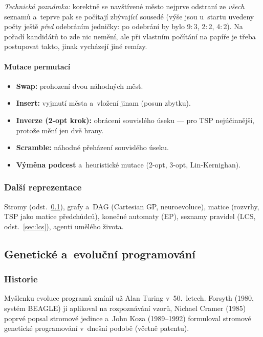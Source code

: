 \documentclass[11pt,a4paper]{article}
\theoremstyle{definition}
\begin{document}
\emph{Technická poznámka:} korektně se navštívené město nejprve odstraní ze
\emph{všech} seznamů a~teprve pak se počítají zbývající sousedé (výše jsou
u~startu uvedeny počty ještě \emph{před} odebráním jedničky: po odebrání by
bylo 9$:$3, 2$:$2, 4$:$2). Na pořadí kandidátů to zde nic nemění, ale při
vlastním počítání na papíře je třeba postupovat takto, jinak vycházejí
jiné remízy.

\paragraph{Mutace permutací}

\begin{itemize}
\item \textbf{Swap:} prohození dvou náhodných měst.
\item \textbf{Insert:} vyjmutí města a~vložení jinam (posun zbytku).
\item \textbf{Inverze (2-opt krok):} obrácení souvislého úseku --- pro TSP
  nejúčinnější, protože mění jen dvě hrany.
\item \textbf{Scramble:} náhodné přeházení souvislého úseku.
\item \textbf{Výměna podcest} a~heuristické mutace (2-opt, 3-opt, Lin-Kernighan).
\end{itemize}

\subsubsection{Další reprezentace}

Stromy (odst.~\ref{sec:gp}), grafy a~DAG (Cartesian GP, neuroevoluce),
matice (rozvrhy, TSP jako matice předchůdců), konečné automaty (EP),
seznamy pravidel (LCS, odst.~\ref{sec:lcs}), agenti umělého života.

\subsection{Genetické a~evoluční programování}
\label{sec:gp}

\subsubsection{Historie}

Myšlenku evoluce programů zmínil už Alan Turing v~50.\ letech. Forsyth
(1980, systém BEAGLE) ji aplikoval na rozpoznávání vzorů, Nichael Cramer
(1985) poprvé popsal stromové jedince a~John Koza (1989--1992) formuloval
stromové genetické programování v~dnešní podobě (včetně patentu).
\end{document}
